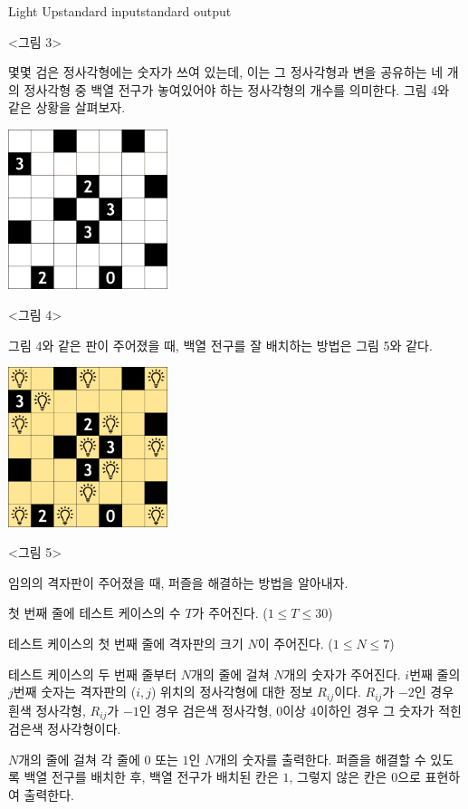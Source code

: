 \begin{problem}{Light Up}{standard input}{standard output}
\begin{center}
  <그림 3>
\end{center}

몇몇 검은 정사각형에는 숫자가 쓰여 있는데, 이는 그 정사각형과 변을 공유하는 네 개의 정사각형 중 백열 전구가 놓여있어야 하는 정사각형의 개수를 의미한다. 
그림 4와 같은 상황을 살펴보자.

\begin{center}
  \includegraphics[width=0.35\textwidth]{figure4.png}

  <그림 4>
\end{center}

그림 4와 같은 판이 주어졌을 때, 백열 전구를 잘 배치하는 방법은 그림 5와 같다.

\begin{center}
  \includegraphics[width=0.35\textwidth]{figure5.png}

  <그림 5>
\end{center}

임의의 격자판이 주어졌을 때, 퍼즐을 해결하는 방법을 알아내자.

\InputFile
첫 번째 줄에 테스트 케이스의 수 $T$가 주어진다. ($1 \le T \le 30$)

테스트 케이스의 첫 번째 줄에 격자판의 크기 $N$이 주어진다. ($1 \le N \le 7$)

테스트 케이스의 두 번째 줄부터 $N$개의 줄에 걸쳐 $N$개의 숫자가 주어진다. 
$i$번째 줄의 $j$번째 숫자는 격자판의 ($i, j$) 위치의 정사각형에 대한 정보 $R_{ij}$이다. 
$R_{ij}$가 $-2$인 경우 흰색 정사각형, $R_{ij}$가 $-1$인 경우 검은색 정사각형, $0$이상 $4$이하인 경우 그 숫자가 적힌 검은색 정사각형이다.

\OutputFile
$N$개의 줄에 걸쳐 각 줄에 $0$ 또는 $1$인 $N$개의 숫자를 출력한다. 
퍼즐을 해결할 수 있도록 백열 전구를 배치한 후, 백열 전구가 배치된 칸은 $1$, 그렇지 않은 칸은 $0$으로 표현하여 출력한다.


\end{problem}
